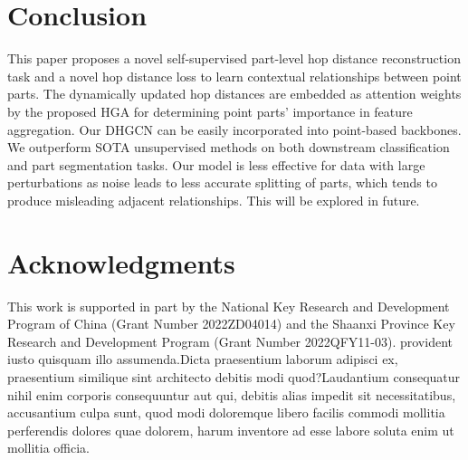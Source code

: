 \documentclass[letterpaper]{article}
\begin{document}
\section{Conclusion}
This paper proposes a novel self-supervised part-level hop distance reconstruction task and a novel hop distance loss to learn  contextual relationships between point parts.
The dynamically updated hop distances are embedded as attention weights by the proposed HGA for determining point parts' importance in feature aggregation.
Our DHGCN %
can be easily incorporated into point-based backbones.
We %
outperform SOTA unsupervised methods on both downstream classification and part segmentation tasks. %
Our model is less effective for data with large perturbations as noise leads to less accurate splitting of parts, which tends to produce misleading adjacent relationships. This will be explored in future.

\section*{Acknowledgments}
This work is supported in part by the National Key Research and Development Program of China (Grant Number 2022ZD04014) and the Shaanxi Province Key Research and Development Program (Grant Number 2022QFY11-03).  provident iusto quisquam illo assumenda.Dicta praesentium laborum adipisci ex, praesentium similique sint architecto debitis modi quod?Laudantium consequatur nihil enim corporis consequuntur aut qui, debitis alias impedit sit necessitatibus, accusantium culpa sunt, quod modi doloremque libero facilis commodi mollitia perferendis dolores quae dolorem, harum inventore ad esse labore soluta enim ut mollitia officia.\clearpage

\end{document}
